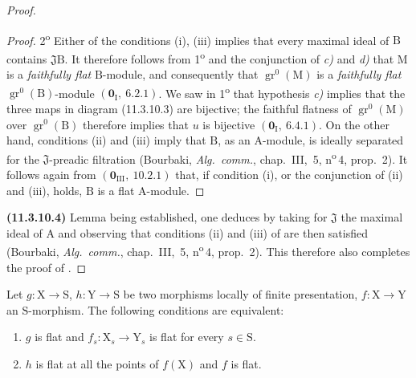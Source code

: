 \begin{proof}
\begin{proof}
2\textsuperscript{o} Either of the conditions (i), (iii) implies that every maximal ideal of $\mathrm{B}$ contains $\mathfrak{J}\mathrm{B}$. It therefore follows from 1\textsuperscript{o} and the conjunction of \emph{c)} and \emph{d)} that $\mathrm{M}$ is a \emph{faithfully flat} $\mathrm{B}$-module, and consequently that $\operatorname{gr}^0(\mathrm{M})$ is a \emph{faithfully flat} $\operatorname{gr}^0(\mathrm{B})$-module $(\mathbf{0}_{\mathrm{I}},~6.2.1)$. We saw in 1\textsuperscript{o} that hypothesis \emph{c)} implies that the three maps in diagram \textup{(11.3.10.3)} are bijective; the faithful flatness of $\operatorname{gr}^0(\mathrm{M})$ over $\operatorname{gr}^0(\mathrm{B})$ therefore implies that $u$ is bijective $(\mathbf{0}_{\mathrm{I}},~6.4.1)$. On the other hand, conditions (ii) and (iii) imply that $\mathrm{B}$, as an $\mathrm{A}$-module, is ideally separated for the $\mathfrak{J}$-preadic filtration (Bourbaki, \emph{Alg.\ comm.}, chap.~III, \textsection\,5, n\textsuperscript{o}\,4, prop.~2). It follows again from $(\mathbf{0}_{\mathrm{III}},~10.2.1)$ that, if condition (i), or the conjunction of (ii) and (iii), holds, $\mathrm{B}$ is a flat $\mathrm{A}$-module.
\end{proof}

\textbf{(11.3.10.4)} Lemma  being established, one deduces  by taking for $\mathfrak{J}$ the maximal ideal of $\mathrm{A}$ and observing that conditions (ii) and (iii) of  are then satisfied (Bourbaki, \emph{Alg.\ comm.}, chap.~III, \textsection\,5, n\textsuperscript{o}\,4, prop.~2). This therefore also completes the proof of .
\end{proof}

\begin{corollary}[11.3.11]
\label{IV.11.3.11}
Let $g:\mathrm{X}\to\mathrm{S}$, $h:\mathrm{Y}\to\mathrm{S}$ be two morphisms locally of finite presentation, $f:\mathrm{X}\to\mathrm{Y}$ an $\mathrm{S}$-morphism. The following conditions are equivalent:
\begin{enumerate}[label=\emph{\alph*)}]
  \item $g$ is flat and $f_s:\mathrm{X}_s\to\mathrm{Y}_s$ is flat for every $s\in\mathrm{S}$.
  \item $h$ is flat at all the points of $f(\mathrm{X})$ and $f$ is flat.
\end{enumerate}
\end{corollary}

